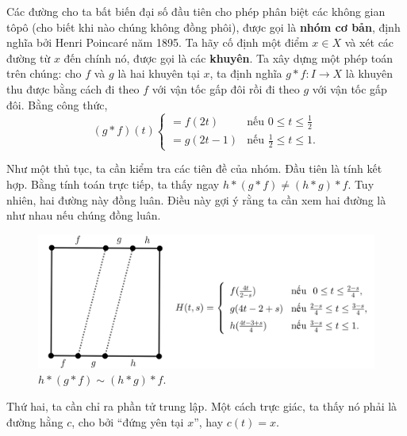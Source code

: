 \documentclass[12pt]{article}
\begin{document}
Các đường cho ta bất biến đại số đầu tiên cho phép phân biệt các không gian tôpô (cho biết khi nào chúng không đồng phôi), được gọi là {\bf nhóm cơ bản}, định nghĩa bởi Henri Poincaré năm 1895. Ta hãy cố định một điểm $x \in X$ và xét các đường từ $x$ đến chính nó, được gọi là các {\bf khuyên}. Ta xây dựng một phép toán trên chúng: cho $f$ và $g$ là hai khuyên tại $x$, ta định nghĩa $g \ast f: I \to X$ là khuyên thu được bằng cách đi theo $f$ với vận tốc gấp đôi rồi đi theo $g$ với vận tốc gấp đôi. Bằng công thức, 
    $$(g \ast f)(t) \begin{cases}
    = f(2t) & \text{nếu } 0 \le t \le \frac{1}{2} \\
    = g(2t-1) & \text{nếu } \frac{1}{2} \le t \le 1.
    \end{cases}$$
    
Như một thủ tục, ta cần kiểm tra các tiên đề của nhóm. Đầu tiên là tính kết hợp. Bằng tính toán trực tiếp, ta thấy ngay $h \ast (g \ast f) \neq (h \ast g) \ast f$. Tuy nhiên, hai đường này đồng luân. Điều này gợi ý rằng ta cần xem hai đường là như nhau nếu chúng đồng luân.

\begin{figure}[h!]
    \centering
    \includegraphics[scale = .25]{h3.png}
    \caption{$h \ast (g \ast f) \sim (h \ast g) \ast f$.}
    \label{h3}
\end{figure}

Thứ hai, ta cần chỉ ra phần tử trung lập. Một cách trực giác, ta thấy nó phải là đường hằng $c$, cho bởi ``đứng yên tại $x$'', hay $c(t) = x$.
\end{document}
